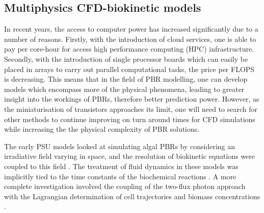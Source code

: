 
\subsection{Multiphysics CFD-biokinetic models}
\label{S:2.6}
In recent years, the access to computer power has increased significantly due to a number of reasons. Firstly, with the introduction of cloud services, one is able to pay per core-hour for access high performance computing (HPC) infrastructure. Secondly, with the introduction of single processor boards which can easily be placed in arrays to carry out parallel computational tasks, the price per FLOPS is decreasing. This means that in the field of PBR modelling, one can develop models which encompass more of the physical phenomena, leading to greater insight into the workings of PBRs, therefore better prediction power. However, as the miniaturisation of transistors approaches its limit, one will need to search for other methods to continue improving on turn around times for CFD simulations while increasing the the physical complexity of PBR solutions. 

\skippingparagraph
The early PSU models looked at simulating algal PBRs by considering an irradiative field varying in space, and the resolution of biokinetic equations were coupled to this field \cite{wu2001,wu2002,merchuk2003,merchuk2007}. The treatment of fluid dynamics in these models was implicitly tied to the time constants of the biochemical reactions \cite{merchuk2007}. A more complete investigation involved the coupling of the two-flux photon approach with the Lagrangian determination of cell trajectories and biomass concentrations \cite{pruvost2008}.



